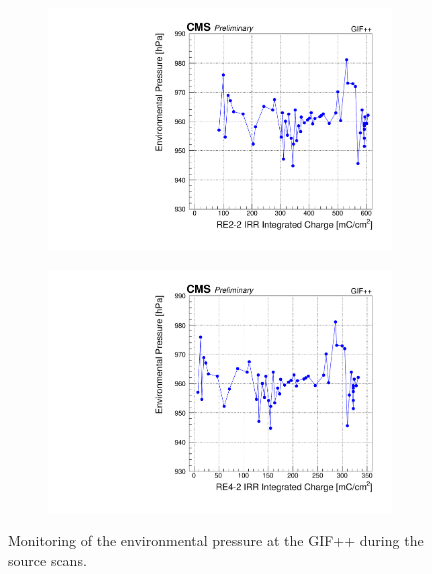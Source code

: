 	\begin{figure}[H]
    	\begin{subfigure}{0.5\linewidth}
    		\centering
			\includegraphics[width = \linewidth]{fig/chapt5/RE2-2-Pressure-monitoring.pdf}
        	\caption{\label{fig:GIFpp-Pressure:A}}
    	\end{subfigure}
    	\begin{subfigure}{0.5\linewidth}
			\centering
    		\includegraphics[width = \linewidth]{fig/chapt5/RE4-2-Pressure-monitoring.pdf}
        	\caption{\label{fig:GIFpp-Pressure:B}}
    	\end{subfigure}
		\caption{\label{fig:GIFpp-Pressure} Monitoring of the environmental pressure at the GIF++ during the source scans.}
	\end{figure}
	
